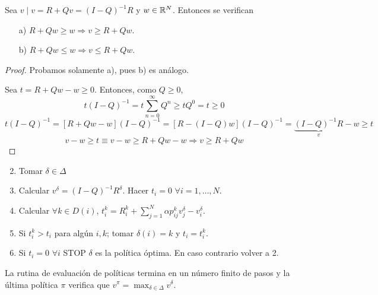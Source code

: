 \documentclass[MIOP.tex]{subfiles}
\begin{document}
\begin{lemma}
Sea $v\mid v=R+Qv=(I-Q)^{-1}R$ y $w\in\mathbb{R}^N$. Entonces se verifican
\begin{itemize}
\item[a)] $R+Qw\geq w\Rightarrow v\geq R+Qw$.
\item[b)] $R+Qw\leq w\Rightarrow v\leq R+Qw$.
\end{itemize} 
\end{lemma}
\begin{proof}
Probamos solamente a), pues b) es análogo. 

Sea $t=R+Qw-w\geq 0$. Entonces, como $Q\geq 0$,
$$t(I-Q)^{-1}=t\sum_{n=0}^\infty Q^n\geq tQ^0=t\geq 0$$
$$t(I-Q)^{-1}=[R+Qw-w](I-Q)^{-1}=[R-(I-Q)w](I-Q)^{-1}=\underbrace{(I-Q)^{-1}R}_{v}-w\geq t$$
$$v-w\geq t\equiv v-w\geq R+Qw-w\Rightarrow v\geq R+Qw$$
\end{proof}
\begin{defi}
\begin{enumerate}
\item[]
\item Tomar $\delta \in \Delta$
\item Calcular $v^\delta = (I-Q)^{-1}R^\delta$. Hacer $t_i =0$ $\forall i=1,\dotsc,N$.
\item Calcular $\forall k\in D(i)$, $t_i^k= R_i^k + \sum_{j=1}^N \alpha p_{ij}^k v^\delta_j - v_i^\delta$. 
\item Si $t_i^k > t_i$ para algún $i,k$; tomar $\delta(i)=k$ y $t_i = t^k_i$.
\item Si $t_i = 0$ $\forall i$ STOP $\delta$ es la política óptima. En caso contrario volver a 2.
\end{enumerate}
\end{defi}
\begin{teorema}
La rutina de evaluación de políticas termina en un número finito de pasos y la última política $\pi$ verifica que $v^\pi = \max_{\delta \in \Delta} v^\delta$.
\end{teorema}
\end{document}
